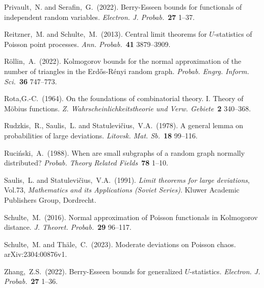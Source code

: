 \documentclass[bj,authoryear,noshowframe]{imsart}
\theoremstyle{plain}
\theoremstyle{remark}
\let\Horig\H
\begin{document}
\begin{thebibliography}{4}
  Privault,~N. and Serafin,~G.~(2022).
  Berry-{E}sseen bounds for functionals of independent random variables.
  \textit{Electron. J. Probab.}~\textbf{27} 1--37.

  Reitzner,~M. and Schulte,~M.~(2013).
  Central limit theorems for ${U}$-statistics of {P}oisson point processes.
  \textit{Ann. Probab.}~\textbf{41} 3879--3909.

  R{\"o}llin,~A.~(2022).
  Kolmogorov bounds for the normal approximation of the number of triangles in the {E}rd{\Horig{o}}s-{R}\'enyi random graph.
  \textit{Probab. Engrg. Inform. Sci.}~\textbf{36} 747--773.

  Rota,G.-C.~(1964).
  On the foundations of combinatorial theory. {I}. Theory of {M}\"obius functions.
  {\em Z. Wahrscheinlichkeitstheorie und Verw. Gebiete}~\textbf{2} 340--368.

  Rudzkis,~R., Saulis,~L. and Statulevi\v{c}ius,~V.A.~(1978).
  A general lemma on probabilities of large deviations.
  \textit{Litovsk. Mat. Sb.}~\textbf{18} 99--116.

  Ruci{\'n}ski,~A.~(1988).
  When are small subgraphs of a random graph normally distributed?
  \textit{Probab. Theory Related Fields}~\textbf{78} 1--10.

  Saulis,~L. and Statulevi\v{c}ius,~V.A.~(1991).
  \textit{Limit theorems for large deviations}, Vol.73, {\em
    Mathematics and its Applications (Soviet Series)}.
  \newblock Kluwer Academic Publishers Group, Dordrecht.

  Schulte,~M.~(2016).
  Normal approximation of {P}oisson functionals in {K}olmogorov distance.
  \textit{J. Theoret. Probab.}~\textbf{29} 96--117.

  Schulte,~M. and Th{\"a}le,~C.~(2023).
  Moderate deviations on {P}oisson chaos.
  arXiv:2304:00876v1.

  Zhang,~Z.S.~(2022).
  Berry-{E}sseen bounds for generalized {$U$}-statistics.
  \textit{Electron. J. Probab.}~\textbf{27} 1--36.


\end{thebibliography}
\end{document}
